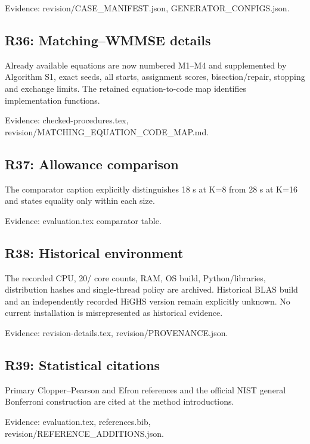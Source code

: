 \documentclass[10pt]{article}
\begin{document}
{\small Evidence: revision/\allowbreak CASE\_\allowbreak MANIFEST.json, GENERATOR\_\allowbreak CONFIGS.json.}

\subsection*{R36: Matching--WMMSE details}

Already available equations are now numbered M1--M4 and supplemented by Algorithm S1, exact seeds, all starts, assignment scores, bisection/\allowbreak repair, stopping and exchange limits. The retained equation-to-code map identifies implementation functions.

{\small Evidence: checked-procedures.tex, revision/\allowbreak MATCHING\_\allowbreak EQUATION\_\allowbreak CODE\_\allowbreak MAP.md.}

\subsection*{R37: Allowance comparison}

The comparator caption explicitly distinguishes 18 s at K=8 from 28 s at K=16 and states equality only within each size.

{\small Evidence: evaluation.tex comparator table.}

\subsection*{R38: Historical environment}

The recorded CPU, 20/ core counts, RAM, OS build, Python/\allowbreak libraries, distribution hashes and single-thread policy are archived. Historical BLAS build and an independently recorded HiGHS version remain explicitly unknown. No current installation is misrepresented as historical evidence.

{\small Evidence: revision-details.tex, revision/\allowbreak PROVENANCE.json.}

\subsection*{R39: Statistical citations}

Primary Clopper--Pearson and Efron references and the official NIST general Bonferroni construction are cited at the method introductions.

{\small Evidence: evaluation.tex, references.bib, revision/\allowbreak REFERENCE\_\allowbreak ADDITIONS.json.}
\end{document}
